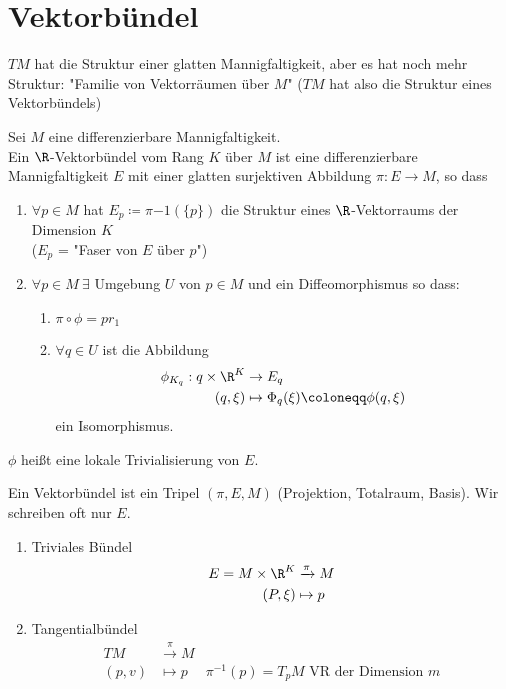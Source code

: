 \section{Vektorbündel}

$TM$ hat die Struktur einer glatten Mannigfaltigkeit, aber es hat noch mehr Struktur: "Familie von Vektorräumen über $M$" ($TM$ hat also die Struktur eines Vektorbündels)

\begin{defs}
Sei $M$ eine differenzierbare Mannigfaltigkeit.\\
Ein $\R$-Vektorbündel vom Rang $K$ über $M$ ist eine differenzierbare Mannigfaltigkeit $E$ mit einer glatten surjektiven Abbildung $\pi: E\rightarrow M$, so dass 
\begin{enumerate}
\item$\forall p \in M$ hat $E_p\coloneqq \pi{-1}(\{p\})$ die Struktur eines $\R$-Vektorraums der Dimension $K$\\
($E_p$ = "Faser von $E$ über $p$")
\item$\forall p\in M\ \exists$ Umgebung $U$ von $p \in M$ und ein Diffeomorphismus
so dass:
\begin{enumerate}
\item$\pi\circ\phi = pr_1$
\item$\forall q\in U$ ist die Abbildung 
\begin{align*}
\phi_{K_q}: {q}\times\R^K &\rightarrow E_q\\
(q, \xi)&\mapsto\Phi_q(\xi)\coloneqq\phi(q, \xi)
\end{align*}
ein Isomorphismus.
\end{enumerate}
\end{enumerate}
$\phi$ heißt eine lokale Trivialisierung von $E$.
\end{defs}

\begin{bem}
Ein Vektorbündel ist ein Tripel $(\pi, E, M)$ (Projektion, Totalraum, Basis). Wir schreiben oft nur $E$.
\end{bem}

\begin{bsp}
\begin{enumerate}
\item Triviales Bündel
\begin{align*}
E = M\times\R^K &\xrightarrow{\pi} M\\
(P, \xi) &\mapsto p
\end{align*}
\item Tangentialbündel
\begin{align*}
TM &\xrightarrow{\pi} M\\
(p, v) &\mapsto p &\pi^{-1}({p}) = T_p M \text{ VR der Dimension }m
\end{align*}
\end{enumerate}
\end{bsp}